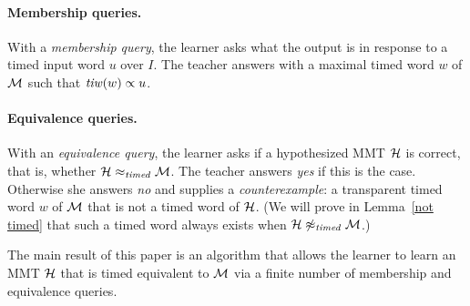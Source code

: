 \paragraph{Membership queries.}
With a \emph{membership query}, the learner asks what the output is in response to a timed input word $u$ over $I$. 
The teacher answers with a maximal timed word $w$ of ${\mathcal M}$ such that $\mathit{tiw}(w) \propto u$.

\paragraph{Equivalence queries.}
With an \emph{equivalence query}, the learner asks if a hypothesized MMT ${\mathcal H}$ is correct, that is, 
whether ${\mathcal H} \approx_{\mathit{timed}} {\mathcal M}$.
The teacher answers \emph{yes} if this is the case. Otherwise she answers \emph{no} and supplies a
\emph{counterexample}: a transparent timed word $w$ of ${\mathcal M}$ that is not a timed word of ${\mathcal H}$.
(We will prove in Lemma~\ref{not timed} that such a timed word always exists
when ${\mathcal H} \not\approx_{\mathit{timed}} {\mathcal M}$.)

\vspace{0.5em}
\noindent
The main result of this paper is an algorithm that allows the learner to learn an MMT ${\mathcal H}$ that is timed equivalent to
${\mathcal M}$ via a finite number of membership and equivalence queries. 

